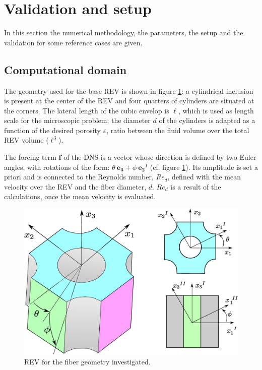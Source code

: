 \section{Validation and setup }



In this section the numerical methodology, the parameters, the setup and the validation for some reference cases are given.



\subsection{Computational domain}



The geometry used for the base REV is shown in figure \ref{fig:cell_3d}: a cylindrical inclusion is present at the center of the REV and four quarters of cylinders are situated at the corners. The lateral length of the cubic envelop is $\ell$, which is used as length scale for the microscopic problem; the diameter $d$ of the cylinders is adapted as a function of the desired porosity $\varepsilon$, ratio between the fluid volume over the total REV volume ($\ell^3$). 

The  forcing term $\mathbf{f}$ of the DNS  is a vector whose direction is defined by two Euler angles, with rotations of the form:  $\theta \ \mathbf{e_3} + \phi \ \mathbf{e_2}^{I}$ (cf. figure \ref{fig:cell_3d}). Its amplitude is set a priori and is connected to the Reynolds number, $Re_d$, defined with the mean velocity over the REV and the fiber diameter, $d$. $Re_d$ is a result of the calculations, once the mean velocity is evaluated.

\begin{figure}[h]
	\centering
	\includegraphics[width=0.8\linewidth]{chapter_4/figure/cell_3d}
	\caption{REV for the fiber geometry investigated.}
	\label{fig:cell_3d}
\end{figure}


